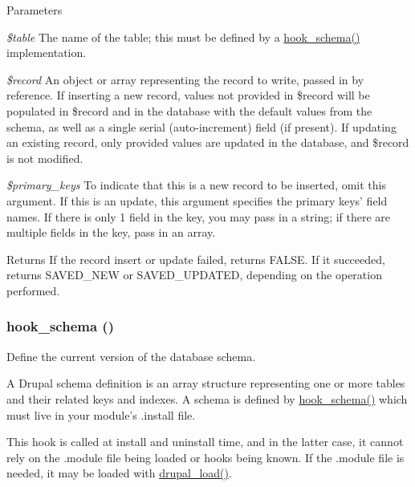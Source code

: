 \begin{DoxyParams}{Parameters}
\item[{\em \$table}]The name of the table; this must be defined by a \hyperlink{group__schemaapi_ga9abd926ddaf68a22e6dca28a25d0c6f5}{hook\_\-schema()} implementation. \item[{\em \$record}]An object or array representing the record to write, passed in by reference. If inserting a new record, values not provided in \$record will be populated in \$record and in the database with the default values from the schema, as well as a single serial (auto-\/increment) field (if present). If updating an existing record, only provided values are updated in the database, and \$record is not modified. \item[{\em \$primary\_\-keys}]To indicate that this is a new record to be inserted, omit this argument. If this is an update, this argument specifies the primary keys' field names. If there is only 1 field in the key, you may pass in a string; if there are multiple fields in the key, pass in an array.\end{DoxyParams}
\begin{DoxyReturn}{Returns}
If the record insert or update failed, returns FALSE. If it succeeded, returns SAVED\_\-NEW or SAVED\_\-UPDATED, depending on the operation performed. 
\end{DoxyReturn}
\hypertarget{group__schemaapi_ga9abd926ddaf68a22e6dca28a25d0c6f5}{
\subsubsection[{hook\_\-schema}]{\setlength{\rightskip}{0pt plus 5cm}hook\_\-schema ()}}
\label{group__schemaapi_ga9abd926ddaf68a22e6dca28a25d0c6f5}
Define the current version of the database schema.

A Drupal schema definition is an array structure representing one or more tables and their related keys and indexes. A schema is defined by \hyperlink{group__schemaapi_ga9abd926ddaf68a22e6dca28a25d0c6f5}{hook\_\-schema()} which must live in your module's .install file.

This hook is called at install and uninstall time, and in the latter case, it cannot rely on the .module file being loaded or hooks being known. If the .module file is needed, it may be loaded with \hyperlink{bootstrap_8inc_a13a2254228f213a980dc1f09886b8802}{drupal\_\-load()}.

